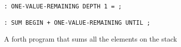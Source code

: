 \begin{figure}[!htb]
    \centering
    \begin{lstlisting}
: ONE-VALUE-REMAINING DEPTH 1 = ;

: SUM BEGIN + ONE-VALUE-REMAINING UNTIL ;
\end{lstlisting}
    \caption{A forth program that sums all the elements on the stack}
    \label{fig:forth_example}
\end{figure}
